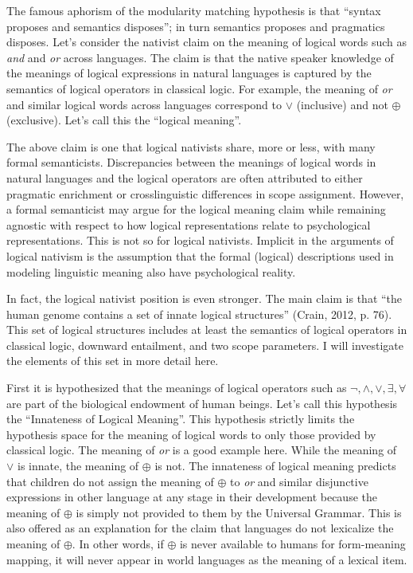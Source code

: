 \documentclass[oneside]{report}
\theoremstyle{definition}
\theoremstyle{definition}
\theoremstyle{definition}
\theoremstyle{remark}
\begin{document}
The famous aphorism of the modularity matching hypothesis is that
``syntax proposes and semantics disposes''; in turn semantics proposes
and pragmatics disposes. Let's consider the nativist claim on the
meaning of logical words such as \emph{and} and \emph{or} across
languages. The claim is that the native speaker knowledge of the
meanings of logical expressions in natural languages is captured by the
semantics of logical operators in classical logic. For example, the
meaning of \emph{or} and similar logical words across languages
correspond to \(\lor\) (inclusive) and not \(\oplus\) (exclusive). Let's
call this the ``logical meaning''.

The above claim is one that logical nativists share, more or less, with
many formal semanticists. Discrepancies between the meanings of logical
words in natural languages and the logical operators are often
attributed to either pragmatic enrichment or crosslinguistic differences
in scope assignment. However, a formal semanticist may argue for the
logical meaning claim while remaining agnostic with respect to how
logical representations relate to psychological representations. This is
not so for logical nativists. Implicit in the arguments of logical
nativism is the assumption that the formal (logical) descriptions used
in modeling linguistic meaning also have psychological reality.

In fact, the logical nativist position is even stronger. The main claim
is that ``the human genome contains a set of innate logical structures''
(Crain, 2012, p. 76). This set of logical structures includes at least
the semantics of logical operators in classical logic, downward
entailment, and two scope parameters. I will investigate the elements of
this set in more detail here.

First it is hypothesized that the meanings of logical operators such as
\(\lnot, \land, \lor, \exists, \forall\) are part of the biological
endowment of human beings. Let's call this hypothesis the ``Innateness
of Logical Meaning''. This hypothesis strictly limits the hypothesis
space for the meaning of logical words to only those provided by
classical logic. The meaning of \emph{or} is a good example here. While
the meaning of \(\lor\) is innate, the meaning of \(\oplus\) is not. The
innateness of logical meaning predicts that children do not assign the
meaning of \(\oplus\) to \emph{or} and similar disjunctive expressions
in other language at any stage in their development because the meaning
of \(\oplus\) is simply not provided to them by the Universal Grammar.
This is also offered as an explanation for the claim that languages do
not lexicalize the meaning of \(\oplus\). In other words, if \(\oplus\)
is never available to humans for form-meaning mapping, it will never
appear in world languages as the meaning of a lexical item.
\end{document}
